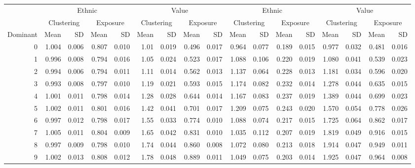 \documentclass[
]{article}
\begin{document}
\begin{table}[H]
\begin{table}
{\begin{tabular}{r|r|r|r|r|r|r|r|r|r|r|r|r|r|r|r|r}
\cline{2-9} \cline{10-17}
\multicolumn{1}{c|}{ } & \multicolumn{4}{c|}{Ethnic} & \multicolumn{4}{c|}{Value} & \multicolumn{4}{c|}{Ethnic} & \multicolumn{4}{c}{Value} \\
\cline{2-5} \cline{6-9} \cline{10-13} \cline{14-17}
\multicolumn{1}{c|}{ } & \multicolumn{2}{c|}{Clustering} & \multicolumn{2}{c|}{Exposure} & \multicolumn{2}{c|}{Clustering} & \multicolumn{2}{c|}{Exposure} & \multicolumn{2}{c|}{Clustering} & \multicolumn{2}{c|}{Exposure} & \multicolumn{2}{c|}{Clustering} & \multicolumn{2}{c}{Exposure} \\
\cline{2-3} \cline{4-5} \cline{6-7} \cline{8-9} \cline{10-11} \cline{12-13} \cline{14-15} \cline{16-17}
Dominant & Mean & SD & Mean & SD & Mean & SD & Mean & SD & Mean & SD & Mean & SD & Mean & SD & Mean & SD\\
\hline
0 & 1.004 & 0.006 & 0.807 & 0.010 & 1.01 & 0.019 & 0.496 & 0.017 & 0.964 & 0.077 & 0.189 & 0.015 & 0.977 & 0.032 & 0.481 & 0.016\\
\hline
1 & 0.996 & 0.008 & 0.794 & 0.016 & 1.05 & 0.024 & 0.523 & 0.017 & 1.088 & 0.106 & 0.220 & 0.019 & 1.080 & 0.041 & 0.539 & 0.023\\
\hline
2 & 0.994 & 0.006 & 0.794 & 0.011 & 1.11 & 0.014 & 0.562 & 0.013 & 1.137 & 0.064 & 0.228 & 0.013 & 1.181 & 0.034 & 0.596 & 0.020\\
\hline
3 & 0.993 & 0.008 & 0.797 & 0.010 & 1.19 & 0.021 & 0.593 & 0.015 & 1.174 & 0.082 & 0.232 & 0.014 & 1.278 & 0.044 & 0.635 & 0.015\\
\hline
4 & 1.001 & 0.011 & 0.798 & 0.014 & 1.28 & 0.028 & 0.644 & 0.014 & 1.167 & 0.083 & 0.237 & 0.019 & 1.389 & 0.044 & 0.699 & 0.023\\
\hline
5 & 1.002 & 0.011 & 0.801 & 0.016 & 1.42 & 0.041 & 0.701 & 0.017 & 1.209 & 0.075 & 0.243 & 0.020 & 1.570 & 0.054 & 0.778 & 0.026\\
\hline
6 & 0.997 & 0.012 & 0.798 & 0.017 & 1.55 & 0.033 & 0.774 & 0.010 & 1.088 & 0.074 & 0.217 & 0.015 & 1.725 & 0.064 & 0.862 & 0.017\\
\hline
7 & 1.005 & 0.011 & 0.804 & 0.009 & 1.65 & 0.042 & 0.831 & 0.010 & 1.035 & 0.112 & 0.207 & 0.019 & 1.819 & 0.049 & 0.916 & 0.015\\
\hline
8 & 0.997 & 0.009 & 0.798 & 0.010 & 1.74 & 0.044 & 0.860 & 0.008 & 1.072 & 0.080 & 0.213 & 0.018 & 1.914 & 0.047 & 0.949 & 0.011\\
\hline
9 & 1.002 & 0.013 & 0.808 & 0.012 & 1.78 & 0.048 & 0.889 & 0.011 & 1.049 & 0.075 & 0.203 & 0.014 & 1.925 & 0.047 & 0.964 & 0.008\\

\end{tabular}}
\end{table}
\end{table}
\end{document}
